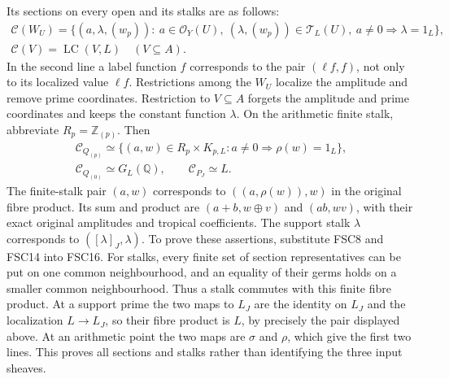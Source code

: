 Its sections on every open and its stalks are as follows:
\begin{equation}\tag{FSC17}
 \begin{gathered}
 \mathcal C(W_U)=
 \{(a,\lambda,(w_p)):\ a\in\mathcal O_Y(U),\
            (\lambda,(w_p))\in\mathcal T_L(U),\
            a\ne0\Rightarrow\lambda=1_L\},\\
 \mathcal C(V)=\operatorname{LC}(V,L)\quad(V\subseteq A).
 \end{gathered}
\end{equation}
In the second line a label function $f$ corresponds to the pair
$(\ell f,f)$, not only to its localized value $\ell f$.
Restrictions among the $W_U$ localize the amplitude and remove prime
coordinates. Restriction to $V\subseteq A$ forgets the amplitude and
prime coordinates and keeps the constant function $\lambda$.
On the arithmetic finite stalk, abbreviate $R_p=\mathbb Z_{(p)}$.
Then
\begin{equation}\tag{FSC18}
 \begin{gathered}
 \mathcal C_{Q_{(p)}}
  \simeq\{(a,w)\in R_p\times K_{p,L}:a\ne0\Rightarrow\rho(w)=1_L\},\\
 \mathcal C_{Q_{(0)}}\simeq G_L(\mathbb Q),\qquad
 \mathcal C_{P_J}\simeq L.
 \end{gathered}
\end{equation}
The finite-stalk pair $(a,w)$ corresponds to
$((a,\rho(w)),w)$ in the original fibre product. Its sum and product
are $(a+b,w\oplus v)$ and $(ab,wv)$, with their exact original
amplitudes and tropical coefficients. The support stalk $\lambda$
corresponds to $([\lambda]_J,\lambda)$.
To prove these assertions, substitute FSC8 and FSC14 into FSC16.
For stalks, every finite set of section representatives can be put on
one common neighbourhood, and an equality of their germs holds on
a smaller common neighbourhood. Thus a stalk commutes with this finite
fibre product. At a support prime the two maps to $L_J$ are the identity
on $L_J$ and the localization $L\to L_J$, so their fibre product is
$L$, by precisely the pair displayed above. At an arithmetic point
the two maps are $\sigma$ and $\rho$, which give the first two lines.
This proves all sections and stalks rather than identifying the three
input sheaves.

